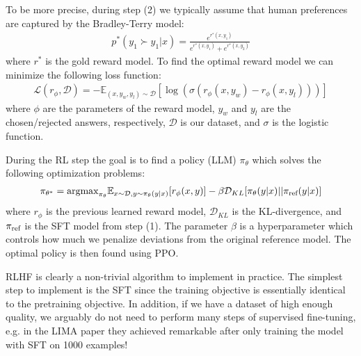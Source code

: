 \documentclass[11pt, oneside]{article}   	%
\begin{document}
To be more precise, during step (2) we typically assume that human preferences are captured by the Bradley-Terry model:
\begin{align}
p^{*}(y_1\succ y_1|x)=\frac{e^{r^{*}(x,y_1)}}{e^{r^{*}(x,y_1)}+e^{r^{*}(x,y_2)}}
\end{align}
where $r^{*}$ is the gold reward model.
To find the optimal reward model we can minimize the following loss function:
\begin{align}
\mathcal{L}(r_{\phi},\mathcal{D}) = - \mathbb{E}_{(x,y_{w},y_{l})\sim\mathcal{D}}\left[\log(\sigma(r_{\phi}(x,y_w)-r_{\phi}(x,y_l)))\right]
\label{eq:reward_optimization}
\end{align}
where $\phi$ are the parameters of the reward model, $y_w$ and $y_l$ are the chosen/rejected answers, respectively, $\mathcal{D}$ is our dataset, and $\sigma$ is the logistic function. 

During the RL step the goal is to find a policy (LLM) $\pi_{\theta}$ which solves the following optimization problems:
\begin{align}
\pi_{\theta^{*}} = \text{argmax}_{\pi_{\theta}}\mathbb{E}_{x\sim \mathcal{D},y\sim \pi_{\theta}(y|x)}[r_{\phi}(x,y)]-\beta \mathcal{D}_{KL}[\pi_{\theta}(y|x)||\pi_{\text{\text{ref}}}(y|x)]
\label{eq:constrained_optimization}
\end{align}
where $r_{\phi}$ is the previous learned reward model, $\mathcal{D}_{KL}$ is the KL-divergence, and $\pi_{\text{\text{ref}}}$ is the SFT model from step (1).
The parameter $\beta$ is a hyperparameter which controls how much we penalize deviations from the original reference model.
The optimal policy is then found using PPO.

RLHF is clearly a non-trivial algorithm to implement in practice. 
The simplest step to implement is the SFT since the training objective is essentially identical to the pretraining objective. 
In addition, if we have a dataset of high enough quality, we arguably do not need to perform many steps of supervised fine-tuning, e.g. in the LIMA paper they achieved remarkable after only training the model with SFT on 1000 examples!
\end{document}
